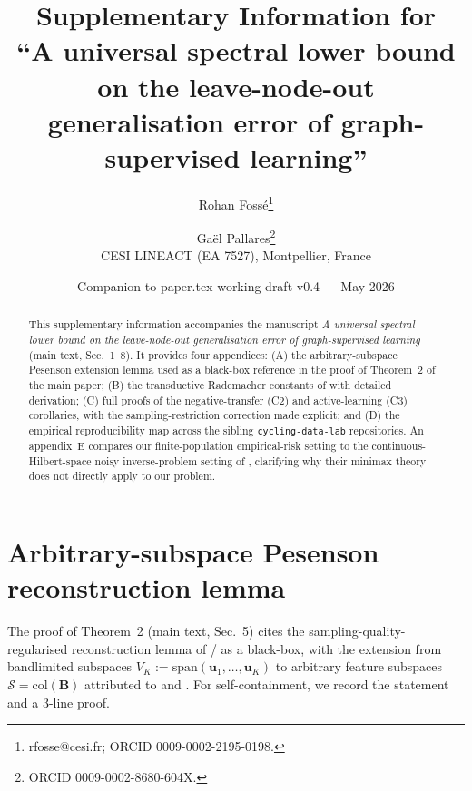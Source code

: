 \documentclass[11pt,a4paper]{article}
\title{Supplementary Information for\\
``A universal spectral lower bound on the leave-node-out generalisation
error of graph-supervised learning''}
\author{Rohan Foss\'e\thanks{rfosse@cesi.fr; ORCID 0009-0002-2195-0198.}
\and Ga\"el Pallares\thanks{ORCID 0009-0002-8680-604X.}\\
\small CESI LINEACT (EA 7527), Montpellier, France}
\date{Companion to paper.tex working draft v0.4 --- May 2026}
\theoremstyle{plain}
\theoremstyle{definition}
\theoremstyle{remark}
\newcommand{\bB}{\mathbf{B}}
\newcommand{\bu}{\mathbf{u}}
\newcommand{\Scal}{\mathcal{S}}
\newcommand{\maintext}[1]{(main text, Sec.~#1)}
\begin{document}
\maketitle

\begin{abstract}
This supplementary information accompanies the manuscript
\emph{A universal spectral lower bound on the leave-node-out
generalisation error of graph-supervised learning} \maintext{1--8}.
It provides four appendices: (A) the arbitrary-subspace Pesenson
extension lemma used as a black-box reference in the proof of
Theorem~2 of the main paper; (B) the transductive Rademacher
constants of \citet{ElYanivPechyony2006} with detailed derivation;
(C) full proofs of the negative-transfer (C2) and active-learning
(C3) corollaries, with the sampling-restriction correction made
explicit; and (D) the empirical reproducibility map across the
sibling \texttt{cycling-data-lab} repositories.  An appendix~E
compares our finite-population empirical-risk setting to the
continuous-Hilbert-space noisy inverse-problem setting of
\citet{BauerPereverzev2005}, clarifying why their minimax theory
does not directly apply to our problem.
\end{abstract}

\section{Arbitrary-subspace Pesenson reconstruction lemma}
\label{sec:si-A}

The proof of Theorem~2 \maintext{5} cites the
sampling-quality-regularised reconstruction lemma of
\citet{Pesenson2008}/\citet{AnisGaddeOrtega2016} as a black-box, with
the extension from bandlimited subspaces $V_K := \mathrm{span}(\bu_1,
\ldots, \bu_K)$ to arbitrary feature subspaces $\Scal = \mathrm{col}(\bB)$
attributed to \citet{ChepuriLeus2018} and \citet{TanakaEldar2020}.
For self-containment, we record the statement and a 3-line proof.
\end{document}
